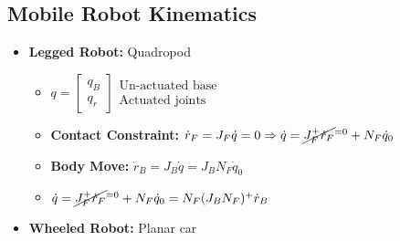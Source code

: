 \documentclass[a4paper]{article}
\newcommand{\ides}[1]{\item \textbf{#1}}
\begin{document}
\subsection{Mobile Robot Kinematics}
\begin{itemize}
    \ides{Legged Robot:} Quadropod
        \begin{itemize}
            \item $q =
                \begin{bmatrix}
                    q_B\\
                    q_r
                \end{bmatrix}
                \begin{matrix}
                    \text{Un-actuated base}\\
                    \text{Actuated joints}
                \end{matrix}$
            \ides{Contact Constraint:} $\dot r_F = J_F \dot q = 0 \Rightarrow \dot q = \cancel{J^+_F \dot r_F}^{=0} + N_F \dot q_0$
            \ides{Body Move:} $\dot r_B = J_B \dot q = J_B N_F \dot q_0$
        \item $\dot q = \cancel{J^+_F \dot r_F}^{=0} + N_F \dot q_0 = N_F(J_B N_F)^+ \dot r_B$
        \end{itemize}
    \ides{Wheeled Robot:} Planar car
\end{itemize}
\end{document}

